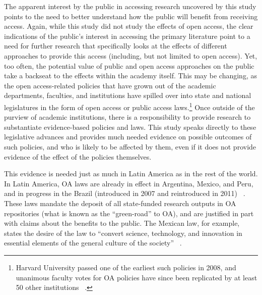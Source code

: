 The apparent interest by the public in accessing research uncovered by this study points to the need to better understand how the public will benefit from receiving access. Again, while this study did not study the effects of open access, the clear indications of the public's interest in accessing the primary literature point to a need for further research that specifically looks at the effects of different approaches to provide this access (including, but not limited to open access). Yet, too often, the potential value of public and open access approaches on the public take a backseat to the effects within the academy itself. This may be changing, as the open access-related policies that have grown out of the academic departments, faculties, and institutions have spilled over into state and national legislatures in the form of open access or public access laws.\footnote{Harvard University passed one of the earliest such policies in 2008, and unanimous faculty votes for OA policies have since been replicated by at least 50 other institutions ~\citep{OADvotes}.} Once outside of the purview of academic institutions, there is a responsibility to provide research to substantiate evidence-based policies and laws. This study speaks directly to these legislative advances and provides much needed evidence on possible outcomes of such policies, and who is likely to be affected by them, even if it does not provide evidence of the effect of the policies themselves.

This evidence is needed just as much in Latin America as in the rest of the world. In Latin America, OA laws are already in effect in Argentina, Mexico, and Peru, and in progress in the Brazil (introduced in 2007 and reintroduced in 2011) ~\citep{UNESCO_GOAP_LATAM}. These laws mandate the deposit of all state-funded research outputs in OA repositories (what is known as the ``green-road'' to OA), and are justified in part with claims about the benefits to the public. The Mexican law, for example, states the desire of the law to ``convert science, technology, and innovation in essential elements of the general culture of the society'' ~\citep[n.p., own translation]{SEGOB2014}.

